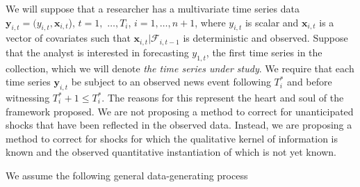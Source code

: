 \documentclass[11pt]{article}
\newcommand{\y}{\textbf{y}}
\newcommand{\x}{\textbf{x}}
\theoremstyle{definition}
\begin{document}
We will suppose that a researcher has a multivariate time series data $\y_{i,t} = (y_{i,t}, \x_{i,t}$), $t = 1,$ $\ldots,  T_i$, $i = 1, \ldots, n+1$, where $y_{i,t}$ is scalar and $\x_{i,t}$ is a vector of covariates such that $\x_{i,t}|\mathcal{F}_{i,t-1}$ is deterministic and observed.  Suppose that the analyst is interested in forecasting $y_{1,t}$, the first time series in the collection, which we will denote \textit{the time series under study}.   We require that each time series $\y_{i,t}$ be subject to an observed news event following $T^*_i$ and before witnessing $T^*_i+1 \leq T_{i}^{*}$.  The reasons for this represent the heart and soul of the framework proposed.  We are not proposing a method to correct for unanticipated shocks that have been reflected in the observed data.  Instead, we are proposing a method to correct for shocks for which the qualitative kernel of information is known and the observed quantitative instantiation of which is not yet known. 

We assume the following general data-generating process
\end{document}
